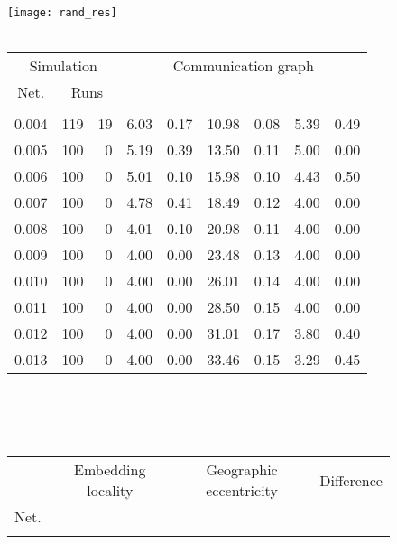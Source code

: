 \documentclass{article}
\begin{document}
\begin{figure}[h]
\begin{center}
\texttt{[image: rand\_res]}
~\\~\\
\begin{tabular}{|r|rr|rr|rr|rr|}
\hline
\multicolumn{3}{|c|}{Simulation} & \multicolumn{6}{|c|}{Communication graph}\\
\multicolumn{1}{|c}{Net.} & \multicolumn{2}{c|}{Runs} & \multicolumn{2}{|c}{} & \multicolumn{2}{c}{} & \multicolumn{2}{c|}{}\\
\hline
\multicolumn{1}{|c|}{} & \multicolumn{1}{|c}{} & \multicolumn{1}{c|}{} & \multicolumn{1}{|c}{} & \multicolumn{1}{c|}{} & \multicolumn{1}{|c}{} & \multicolumn{1}{c|}{} & \multicolumn{1}{|c}{} & \multicolumn{1}{c|}{}\\
0.004 & 119 & 19 & 6.03 & 0.17 & 10.98 & 0.08 & 5.39 & 0.49\\
0.005 & 100 &  0 & 5.19 & 0.39 & 13.50 & 0.11 & 5.00 & 0.00\\
0.006 & 100 &  0 & 5.01 & 0.10 & 15.98 & 0.10 & 4.43 & 0.50\\
0.007 & 100 &  0 & 4.78 & 0.41 & 18.49 & 0.12 & 4.00 & 0.00\\
0.008 & 100 &  0 & 4.01 & 0.10 & 20.98 & 0.11 & 4.00 & 0.00\\
0.009 & 100 &  0 & 4.00 & 0.00 & 23.48 & 0.13 & 4.00 & 0.00\\
0.010 & 100 &  0 & 4.00 & 0.00 & 26.01 & 0.14 & 4.00 & 0.00\\
0.011 & 100 &  0 & 4.00 & 0.00 & 28.50 & 0.15 & 4.00 & 0.00\\
0.012 & 100 &  0 & 4.00 & 0.00 & 31.01 & 0.17 & 3.80 & 0.40\\
0.013 & 100 &  0 & 4.00 & 0.00 & 33.46 & 0.15 & 3.29 & 0.45\\
\hline
\end{tabular}\\
~\\~\\
\begin{tabular}{|r|rr|rr|rr|rr|rr|}
\hline
& \multicolumn{4}{|c|}{Embedding locality} & \multicolumn{4}{|c|}{Geographic eccentricity} & \multicolumn{2}{|c|}{Difference}\\
Net. & \multicolumn{2}{c}{} & \multicolumn{2}{c|}{} & \multicolumn{2}{c}{} & \multicolumn{2}{c|}{}&  & \\
\hline
\multicolumn{1}{|c|}{} & \multicolumn{1}{|c}{} & \multicolumn{1}{c|}{} & \multicolumn{1}{|c}{} & \multicolumn{1}{c|}{} & \multicolumn{1}{|c}{} & \multicolumn{1}{c|}{} & \multicolumn{1}{|c}{} & \multicolumn{1}{c|}{} & \multicolumn{1}{|c}{} & \multicolumn{1}{c|}{}\\

\end{tabular}
\end{center}
\end{figure}
\end{document}
